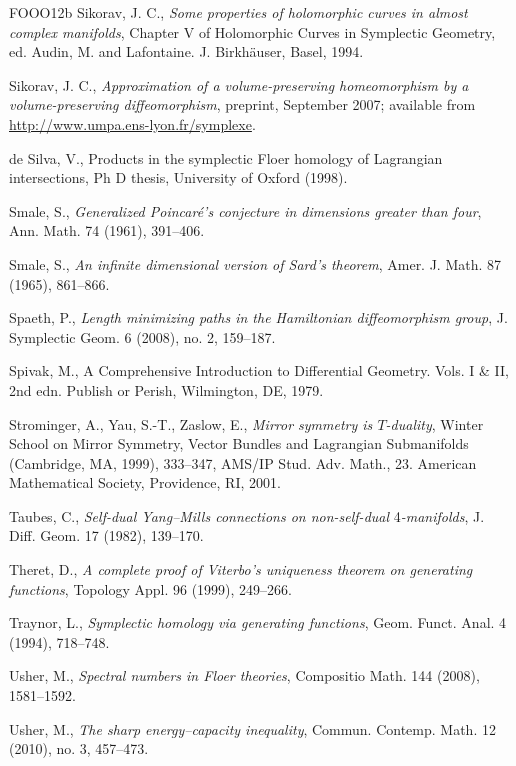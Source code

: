 \begin{thebibliography}{FOOO12b}
 Sikorav, J. C., \emph{Some properties of holomorphic curves in almost complex
  manifolds}, Chapter V of Holomorphic Curves in Symplectic Geometry, ed. Audin, M. and Lafontaine. J.
  Birkhäuser, Basel, 1994.

 Sikorav, J. C., \emph{Approximation of a volume-preserving homeomorphism by a
  volume-preserving diﬀeomorphism}, preprint, September 2007; available from
  \url{http://www.umpa.ens-lyon.fr/symplexe}.

 de Silva, V., Products in the symplectic Floer homology of Lagrangian
  intersections, Ph D thesis, University of Oxford (1998).

 Smale, S., \emph{Generalized Poincaré’s conjecture in dimensions greater than four},
  Ann. Math. 74 (1961), 391–406.

 Smale, S., \emph{An infinite dimensional version of Sard’s theorem}, Amer. J. Math.
  87 (1965), 861–866.

 Spaeth, P., \emph{Length minimizing paths in the Hamiltonian diﬀeomorphism group},
  J. Symplectic Geom. 6 (2008), no. 2, 159–187.

 Spivak, M., A Comprehensive Introduction to Diﬀerential Geometry. Vols. I \& II,
  2nd edn. Publish or Perish, Wilmington, DE, 1979.

 Strominger, A., Yau, S.-T., Zaslow, E., \emph{Mirror symmetry is $T$-duality},
  Winter School on Mirror Symmetry, Vector Bundles and Lagrangian Submanifolds (Cambridge, MA, 1999),
  333–347, AMS/IP Stud. Adv. Math., 23. American Mathematical Society, Providence, RI, 2001.

 Taubes, C., \emph{Self-dual Yang–Mills connections on non-self-dual}
  4\emph{-manifolds}, J. Diﬀ. Geom. 17 (1982), 139–170.

 Theret, D., \emph{A complete proof of Viterbo’s uniqueness theorem on gener\-ating
  functions}, Topology Appl. 96 (1999), 249–266.

 Traynor, L., \emph{Symplectic homology via generating functions}, Geom. Funct. Anal.
  4 (1994), 718–748.

 Usher, M., \emph{Spectral numbers in Floer theories}, Compositio Math. 144 (2008),
  1581–1592.

 Usher, M., \emph{The sharp energy–capacity inequality}, Commun. Contemp. Math.
  12 (2010), no. 3, 457–473.


\end{thebibliography}
